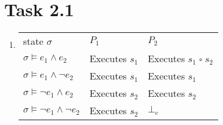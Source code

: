 \documentclass{article}
\newcommand{\answer}{\item[]} %
\begin{document}
	\section{Task 2.1}
		\begin{enumerate}[label = {(\alph*)}]
			
			\answer 
			\begin{table}[H]
				\begin{tabular}{lll}
					state $\sigma$ & $P_{1}$ & $P_{2}$ \\
					$\sigma \models e_{1} \land e_{2}$ & Executes $s_{1}$ & Executes $s_{1} \; \square \; s_{2}$ \\
					$\sigma \models e_{1} \land \neg e_{2}$ & Executes $s_{1}$ & Executes $s_{1}$ \\
					$\sigma \models \neg e_{1} \land e_{2}$ & Executes $s_{2}$ & Executes $s_{2}$ \\
					$\sigma \models \neg e_{1} \land \neg e_{2}$ & Executes $s_{2}$ & $\bot_{e}$ \\
				\end{tabular}
			\end{table}
			
		\end{enumerate}
	
	\pagebreak
	
\end{document}
